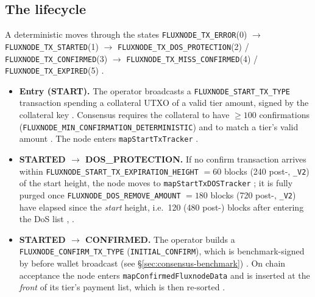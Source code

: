 \subsection{The \FluxNode lifecycle}
\label{sec:consensus-lifecycle}

A deterministic \FluxNode moves through the states
\texttt{FLUXNODE\_TX\_ERROR}(0) $\to$ \texttt{FLUXNODE\_TX\_STARTED}(1) $\to$
\texttt{FLUXNODE\_TX\_DOS\_PROTECTION}(2) / \texttt{FLUXNODE\_TX\_CONFIRMED}(3) $\to$
\texttt{FLUXNODE\_TX\_MISS\_CONFIRMED}(4) / \texttt{FLUXNODE\_TX\_EXPIRED}(5)
\shipped {}.

\begin{itemize}
\item \textbf{Entry (START).} The operator broadcasts a \texttt{FLUXNODE\_START\_TX\_TYPE} transaction
spending a collateral UTXO of a valid tier amount, signed by the collateral key
\shipped {}. Consensus requires the collateral
to have $\ge 100$ confirmations (\texttt{FLUXNODE\_MIN\_CONFIRMATION\_DETERMINISTIC})
\shipped {} and to match a tier's valid amount
\shipped {}. The node enters \texttt{map\allowbreak{}Start\allowbreak{}Tx\allowbreak{}Tracker}
\shipped {}.

\item \textbf{STARTED $\to$ DOS\_PROTECTION.} If no confirm transaction arrives within
\texttt{FLUXNODE\_START\_TX\_EXPIRATION\_HEIGHT} $= 60$ blocks (240 post-\PoN,
\texttt{\_V2}) of the start height, the node moves to \texttt{map\allowbreak{}Start\allowbreak{}Tx\allowbreak{}DOSTracker}
\shipped {}; it is fully purged once
\texttt{FLUXNODE\_DOS\_REMOVE\_AMOUNT} $= 180$ blocks (720 post-\PoN, \texttt{\_V2}) have elapsed since
the \emph{start} height, i.e.\ 120 (480 post-\PoN) blocks after entering the DoS list
\shipped {},
.

\item \textbf{STARTED $\to$ CONFIRMED.} The operator builds a \texttt{FLUXNODE\_CONFIRM\_TX\_TYPE}
(\texttt{INITIAL\_CONFIRM}), which is benchmark-signed by \fluxbench before wallet broadcast (see
\S\ref{sec:consensus-benchmark}) \shipped {}.
On chain acceptance the node enters \texttt{map\allowbreak{}Confirmed\allowbreak{}Fluxnode\allowbreak{}Data} and is inserted at the
\emph{front} of its tier's payment list, which is then re-sorted
\shipped {}.


\end{itemize}
